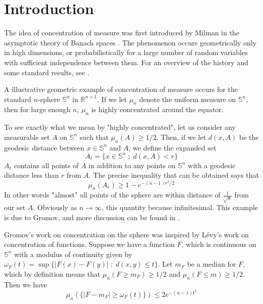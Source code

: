 \documentclass[12pt]{report}
\theoremstyle{definition}
\begin{document}
\tableofcontents
\listoffigures
\chapter{Introduction}

The idea of concentration of measure was first introduced by Milman in the asymptotic theory of Banach spaces \cite{Milman}.  The phenomenon occurs geometrically only in high dimensions, or probabilistically for a large number of random variables with sufficient independence between them. For an overview of the history and some standard results, see \cite{LedouxCOM}.

 A illustrative geometric example of concentration of measure occurs for the standard $n$-sphere $\mathbb{S}^n$ in $\mathbb{R}^{n+1}$.  If we let $\mu_n$ denote the uniform measure on $\mathbb{S}^n$, then for large enough $n$, $\mu_n$ is highly concentrated around the equator.  

To see exactly what we mean by "highly concentrated", let us consider any measurable set $A$ on $\mathbb{S}^n$ such that $\mu_n(A)\geq 1/2$.  Then, if we let $d(x,A)$ be the geodesic distance between $x\in\mathbb{S}^n$ and $A$, we define the expanded set 
$$
A_t=\{x\in\mathbb{S}^n\; ; \; d(x,A)<r\}
$$
$A_t$ contains all points of $A$ in addition to any points on $\mathbb{S}^n$ with a geodesic distance less than $r$ from $A$.  The precise inequality that can be obtained says that 
$$
\mu_n(A_r)\geq 1-e^{-(n-1)r^2/2}
$$
In other words "almost" all points of the sphere are within distance of $\frac{1}{\sqrt{n}}$ from our set $A$.  Obviously as $n\rightarrow\infty$, this quantity because infinitesimal.  This example is due to Gromov, and more discussion can be found in \cite{Gromov}.  

Gromov's work on concentration on the sphere was inspired by L\'{e}vy's work \cite{Levy} on concentration of functions.  Suppose we have a function $F$, which is continuous on $\mathbb{S}^n$ with a modulus of continuity given by $\omega_F(t)=\sup\{|F(x)-F(y)|\; : \;d(x,y)\leq t\}$.  Let $m_F$ be a median for $F$, which by definition means that $\mu_n(F\geq m_F)\geq 1/2$ and $\mu_n(F\leq m)\geq 1/2$.  Then we have
$$
\mu_n(\{|F-m_F|\geq \omega_F(t)\})\leq 2e^{-(n-1)t^2}
$$
\end{document}
